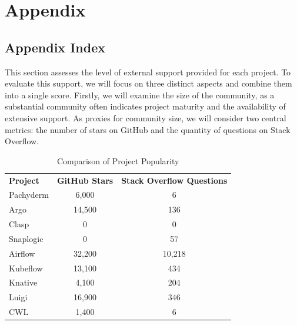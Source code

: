 \chapter*{Appendix}
\section*{Appendix Index}
\vspace{-8em}

\abstaendeanhangverzeichnis

\listofanhang
\clearpage
{} 







This section assesses the level of external support provided for each project. To evaluate this support, we will focus on three distinct aspects and combine them into a single score. Firstly, we will examine the size of the community, as a substantial community often indicates project maturity and the availability of extensive support. As proxies for community size, we will consider two central metrics: the number of stars on GitHub and the quantity of questions on Stack Overflow.

\begin{table}[htb]
    \centering
    \caption{Comparison of Project Popularity}
    \label{tab:table1} 
    \begin{tabular}{|l|c|c|} 
      \textbf{Project} & \textbf{GitHub Stars} & \textbf{Stack Overflow Questions} \\ 
      Pachyderm  & 6,000   & 6          \\ 
      Argo       & 14,500  & 136        \\ 
      Clasp      & 0       & 0          \\ 
      Snaplogic  & 0       & 57         \\ 
      Airflow    & 32,200  & 10,218     \\ 
      Kubeflow   & 13,100  & 434        \\ 
      Knative    & 4,100   & 204        \\ 
      Luigi      & 16,900  & 346        \\ 
      CWL        & 1,400   & 6          \\ 
   \end{tabular}
\end{table}


